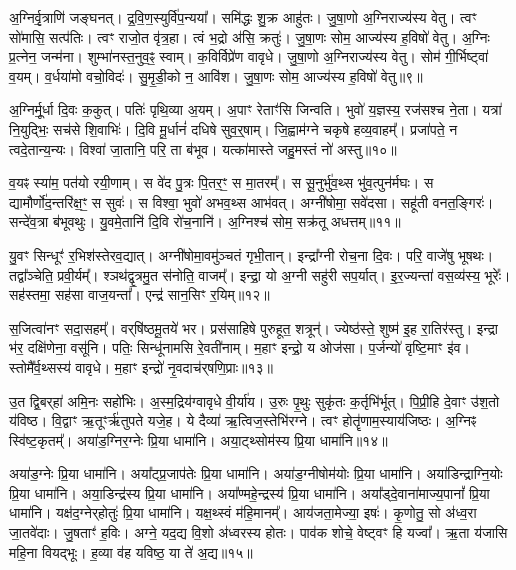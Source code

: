 अ॒ग्निर्वृ॒त्राणि॑ जङ्घनत्।
द्र॒वि॒ण॒स्युर्वि॑प॒न्यया᳚।
समि॑द्धः शु॒क्र आहु॑तः।
जु॒षा॒णो अ॒ग्निराज्य॑स्य वेतु।
त्वꣳ सो॑मासि॒ सत्प॑तिः।
त्वꣳ राजो॒त वृ॑त्र॒हा।
त्वं भ॒द्रो अ॑सि॒ क्रतुः॑।
जु॒षा॒णः सोम॒ आज्य॑स्य ह॒विषो॑ वेतु।
अ॒ग्निः प्र॒त्नेन॒ जन्म॑ना।
शुम्भा॑नस्त॒नुव॒ꣴ॒ स्वाम्।
क॒विर्विप्रे॑ण वावृधे।
जु॒षा॒णो अ॒ग्निराज्य॑स्य वेतु।
सोम॑ गी॒र्भिष्ट्वा॑ व॒यम्।
व॒र्धया॑मो वचो॒विदः॑।
सु॒मृ॒डी॒को न॒ आवि॑श।
जु॒षा॒णः सोम॒ आज्य॑स्य ह॒विषो॑ वेतु॥९॥\ip\anuvakamend[स्वाꣳ षट् च॑]

अ॒ग्निर्मू॒र्धा दि॒वः क॒कुत्।
पतिः॑ पृथि॒व्या अ॒यम्।
अ॒पाꣳ रेताꣳ॑सि जिन्वति।
भुवो॑ य॒ज्ञस्य॒ रज॑सश्च ने॒ता।
यत्रा॑ नि॒युद्भिः॒ सच॑से शि॒वाभिः॑।
दि॒वि मू॒र्धानं॑ दधिषे सुव॒र्॒षाम्।
जि॒ह्वाम॑ग्ने चकृषे हव्य॒वाहम्᳚।
प्रजा॑पते॒ न त्वदे॒तान्य॒न्यः।
विश्वा॑ जा॒तानि॒ परि॒ ता ब॑भूव।
यत्का॑मास्ते जहु॒मस्तं नो॑ अस्तु॥१०॥\ip

व॒यꣴ स्या॑म॒ पत॑यो रयी॒णाम्।
स वे॑द पु॒त्रः पि॒तर॒ꣳ॒ स मा॒तरम्᳚।
स सू॒नुर्भु॑व॒थ्स भु॑व॒त्पुन॑र्मघः।
स द्यामौर्णो॑द॒न्तरि॑क्ष॒ꣳ॒ स सुवः॑।
स विश्वा॒ भुवो॑ अभव॒थ्स आभ॑वत्।
अग्नी॑षोमा॒ सवे॑दसा।
सहू॑ती वनत॒ङ्गिरः॑।
सन्दे॑व॒त्रा ब॑भूवथुः।
यु॒वमे॒तानि॑ दि॒वि रो॑च॒नानि॑।
अ॒ग्निश्च॑ सोम॒ सक्र॑तू अधत्तम्॥११॥\ip

यु॒वꣳ सिन्धूꣳ॑ र॒भिश॑स्तेरव॒द्यात्।
अग्नी॑षोमा॒वमु॑ञ्चतं गृभी॒तान्।
इन्द्रा᳚ग्नी रोच॒ना दि॒वः।
परि॒ वाजे॑षु भूषथः।
तद्वा᳚ञ्चेति॒ प्रवी॒र्यम्᳚।
श्ञथ॑द्वृ॒त्रमु॒त स॑नोति॒ वाजम्᳚।
इन्द्रा॒ यो अ॒ग्नी सहु॑री सप॒र्यात्।
इ॒र॒ज्यन्ता॑ वस॒व्य॑स्य॒ भूरेः᳚।
सह॑स्तमा॒ सह॑सा वाज॒यन्ता᳚।
एन्द्र॑ सान॒सिꣳ र॒यिम्॥१२॥\ip

स॒जित्वा॑नꣳ सदा॒सहम्᳚।
वर्‌\mbox{}षि॑ष्ठमू॒तये॑ भर।
प्रस॑साहिषे पुरुहूत॒ शत्रून्॑।
ज्येष्ठ॑स्ते॒ शुष्म॑ इ॒ह रा॒तिर॑स्तु।
इन्द्रा भ॑र॒ दक्षि॑णेना॒ वसू॑नि।
पतिः॒ सिन्धू॑नामसि रे॒वती॑नाम्।
म॒हाꣳ इन्द्रो॒ य ओज॑सा।
प॒र्जन्यो॑ वृष्टि॒माꣳ इ॑व।
स्तोमै᳚र्व॒थ्सस्य॑ वावृधे।
म॒हाꣳ इन्द्रो॑ नृ॒वदाच॑र्‌\mbox{}षणि॒प्राः॥१३॥\ip

उ॒त द्वि॒बर्‌\mbox{}हा॑ अमि॒नः सहो॑भिः।
अ॒स्म॒द्रिय॑ग्वावृधे वी॒र्या॑य।
उ॒रुः पृ॒थुः सुकृ॑तः क॒र्तृभि॑र्भूत्।
पि॒प्री॒हि दे॒वाꣳ उ॑श॒तो य॑विष्ठ।
वि॒द्वाꣳ ऋ॒तूꣳर्\mbox{}ऋ॑तुपते यजे॒ह।
ये दैव्या॑ ऋ॒त्विज॒स्तेभि॑रग्ने।
त्वꣳ होतॄ॑णाम॒स्याय॑जिष्ठः।
अ॒ग्निꣴ स्वि॑ष्ट॒कृतम्᳚।
अया॑ड॒ग्निर॒ग्नेः प्रि॒या धामा॑नि।
अया॒ट्थ्सोम॑स्य प्रि॒या धामा॑नि॥१४॥\ip

अया॑ड॒ग्नेः प्रि॒या धामा॑नि।
अया᳚ट्प्र॒जा\-प॑तेः प्रि॒या धामा॑नि।
अया॑ड॒ग्नीषोम॑योः प्रि॒या धामा॑नि।
अया॑डिन्द्राग्नि॒योः प्रि॒या धामा॑नि।
अया॒डिन्द्र॑स्य प्रि॒या धामा॑नि।
अया᳚ण्महे॒न्द्रस्य॑ प्रि॒या धामा॑नि।
अया᳚ड्दे॒वाना॑माज्य॒पानां᳚ प्रि॒या धामा॑नि।
यक्ष॑द॒ग्नेर्‌\mbox{}होतुः॑ प्रि॒या धामा॑नि।
यक्ष॒थ्स्वं म॑हि॒मानम्᳚।
आय॑जता॒मेज्या॒ इषः॑।
कृ॒णोतु॒ सो अ॑ध्व॒रा जा॒तवे॑दाः।
जु॒षताꣳ॑ ह॒विः।
अग्ने॒ यद॒द्य वि॒शो अ॑ध्वरस्य होतः।
पाव॑क शोचे॒ वेष्ट्वꣳ हि यज्वा᳚।
ऋ॒ता य॑जासि महि॒ना वियद्भूः।
ह॒व्या व॑ह यविष्ठ॒ या ते॑ अ॒द्य॥१५॥\ip\anuvakamend[अ॒स्त्व॒ध॒त्त॒ꣳ॒ र॒यिं च॑र्‌\mbox{}षणि॒प्राः सोम॑स्य प्रि॒या धामा॒नीषः॒ षट्च॑]

